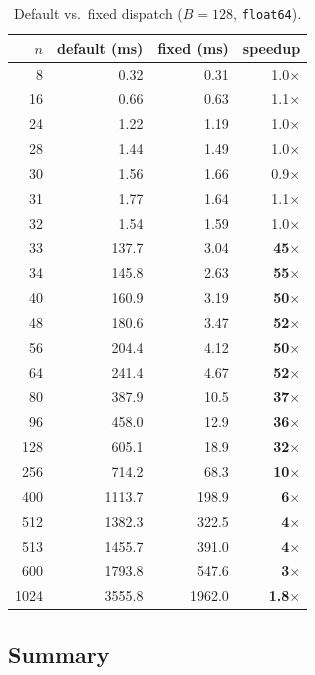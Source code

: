 \documentclass[10pt, letterpaper]{article}
\begin{document}
\begin{table}[h]
\centering
\caption{Default vs.\ fixed dispatch ($B = 128$, \texttt{float64}).}
\label{tab:f64_B128}
\begin{tabular}{r rrr}
\toprule
$n$ & default (ms) & fixed (ms) & speedup \\
\midrule
     8  &    0.32 &    0.31 & 1.0$\times$ \\
    16  &    0.66 &    0.63 & 1.1$\times$ \\
    24  &    1.22 &    1.19 & 1.0$\times$ \\
    28  &    1.44 &    1.49 & 1.0$\times$ \\
    30  &    1.56 &    1.66 & 0.9$\times$ \\
    31  &    1.77 &    1.64 & 1.1$\times$ \\
    32  &    1.54 &    1.59 & 1.0$\times$ \\
\midrule
    33  &   137.7 &    3.04 & \textbf{45$\times$} \\
    34  &   145.8 &    2.63 & \textbf{55$\times$} \\
    40  &   160.9 &    3.19 & \textbf{50$\times$} \\
    48  &   180.6 &    3.47 & \textbf{52$\times$} \\
    56  &   204.4 &    4.12 & \textbf{50$\times$} \\
    64  &   241.4 &    4.67 & \textbf{52$\times$} \\
    80  &   387.9 &    10.5 & \textbf{37$\times$} \\
    96  &   458.0 &    12.9 & \textbf{36$\times$} \\
   128  &   605.1 &    18.9 & \textbf{32$\times$} \\
   256  &   714.2 &    68.3 & \textbf{10$\times$} \\
   400  &  1113.7 &   198.9 & \textbf{6$\times$} \\
   512  &  1382.3 &   322.5 & \textbf{4$\times$} \\
   513  &  1455.7 &   391.0 & \textbf{4$\times$} \\
   600  &  1793.8 &   547.6 & \textbf{3$\times$} \\
  1024  &  3555.8 &  1962.0 & \textbf{1.8$\times$} \\
\bottomrule
\end{tabular}
\end{table}





\subsection{Summary}
\end{document}
